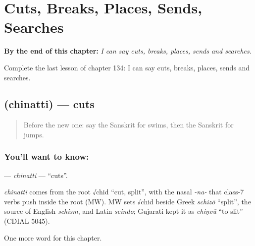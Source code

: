 
\chapter{Cuts, Breaks, Places, Sends, Searches}
\label{ch:sa-cuts-breaks-places-sends-searches}

\begin{chapteropening}
\textbf{By the end of this chapter:} \emph{I can say cuts, breaks, places, sends and searches.}

Complete the last lesson of chapter 134: I can say cuts, breaks, places, sends and searches.
\end{chapteropening}

\section[\texorpdfstring{\sk{छिनत्ति} (chinatti)}{छिनत्ति (chinatti)}]{ (chinatti) — cuts}

\label{lesson:SA-C134-chinatti}



\begin{quote}
Before the new one: say the Sanskrit for swims, then the Sanskrit for jumps.
\end{quote}

\subsection*{You'll want to know: }
\textbf{} — \emph{chinatti} — \textquotedblleft{}cuts\textquotedblright{}.

\begin{cousinweb}
\emph{chinatti} comes from the root √chid \textquotedblleft{}cut, split\textquotedblright{}, with the nasal \emph{-na-} that class-7 verbs push inside the root (MW). MW sets √chid beside Greek \emph{schizō} \textquotedblleft{}split\textquotedblright{}, the source of English \emph{schism}, and Latin \emph{scindo}; Gujarati kept it as \emph{chiṇvũ} \textquotedblleft{}to slit\textquotedblright{} (CDIAL 5045).
\end{cousinweb}

\begin{grammarlens}[title={What you've built}]
One more word for this chapter.
\end{grammarlens}

